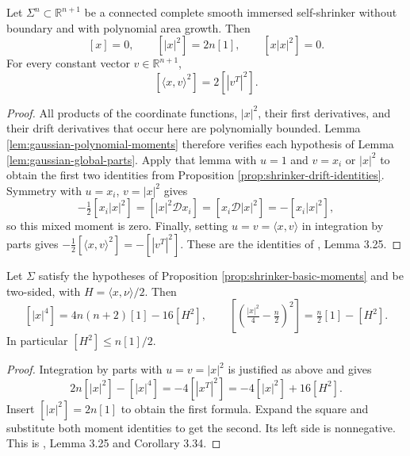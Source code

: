 \begin{proposition}\label{prop:shrinker-basic-moments}
Let $\Sigma^n\subset\mathbb R^{n+1}$ be a connected complete smooth immersed self-shrinker without boundary and with polynomial area growth. Then
\[
 [x]=0,\qquad [|x|^2]=2n[1],\qquad [x|x|^2]=0.
\]
For every constant vector $v\in\mathbb R^{n+1}$,
\[
 [\langle x,v\rangle^2]=2[|v^T|^2].
\]
\end{proposition}
\begin{proof}
All products of the coordinate functions, $|x|^2$, their first derivatives, and their drift derivatives that occur here are polynomially bounded. Lemma \ref{lem:gaussian-polynomial-moments} therefore verifies each hypothesis of Lemma \ref{lem:gaussian-global-parts}. Apply that lemma with $u=1$ and $v=x_i$ or $|x|^2$ to obtain the first two identities from Proposition \ref{prop:shrinker-drift-identities}. Symmetry with $u=x_i$, $v=|x|^2$ gives
\[
 -\tfrac12[x_i|x|^2]=[|x|^2\mathcal Dx_i]
 =[x_i\mathcal D|x|^2]=-[x_i|x|^2],
\]
so this mixed moment is zero. Finally, setting $u=v=\langle x,v\rangle$ in integration by parts gives $-\tfrac12[\langle x,v\rangle^2]=-[|v^T|^2]$. These are the identities of \cite{CM12}, Lemma 3.25.
\end{proof}

\begin{proposition}\label{prop:shrinker-fourth-moment}
Let $\Sigma$ satisfy the hypotheses of Proposition \ref{prop:shrinker-basic-moments} and be two-sided, with $H=\langle x,\nu\rangle/2$. Then
\[
 [|x|^4]=4n(n+2)[1]-16[H^2],
 \qquad
 \left[\left(\tfrac{|x|^2}{4}-\tfrac n2\right)^2\right]
 =\tfrac n2[1]-[H^2].
\]
In particular $[H^2]\leq n[1]/2$.
\end{proposition}
\begin{proof}
Integration by parts with $u=v=|x|^2$ is justified as above and gives
\[
 2n[|x|^2]-[|x|^4]=-4[|x^T|^2]
 =-4[|x|^2]+16[H^2].
\]
Insert $[|x|^2]=2n[1]$ to obtain the first formula. Expand the square and substitute both moment identities to get the second. Its left side is nonnegative. This is \cite{CM12}, Lemma 3.25 and Corollary 3.34.
\end{proof}

